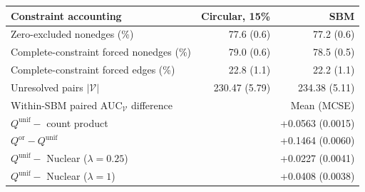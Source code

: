 \begin{tabular}{lrr}
\toprule
Constraint accounting & Circular, 15\% & SBM \\
\midrule
Zero-excluded nonedges (\%) & 77.6 (0.6) & 77.2 (0.6) \\
Complete-constraint forced nonedges (\%) & 79.0 (0.6) & 78.5 (0.5) \\
Complete-constraint forced edges (\%) & 22.8 (1.1) & 22.2 (1.1) \\
Unresolved pairs $|\mathcal V|$ & 230.47 (5.79) & 234.38 (5.11) \\
\midrule
\multicolumn{2}{l}{Within-SBM paired AUC$_{\mathcal V}$ difference} & Mean (MCSE) \\
\midrule
\multicolumn{2}{l}{$Q^{\mathrm{unif}}-$ count product} & +0.0563 (0.0015) \\
\multicolumn{2}{l}{$Q^{\mathrm{or}}-Q^{\mathrm{unif}}$} & +0.1464 (0.0060) \\
\multicolumn{2}{l}{$Q^{\mathrm{unif}}-$ Nuclear ($\lambda=0.25$)} & +0.0227 (0.0041) \\
\multicolumn{2}{l}{$Q^{\mathrm{unif}}-$ Nuclear ($\lambda=1$)} & +0.0408 (0.0038) \\
\bottomrule
\end{tabular}
